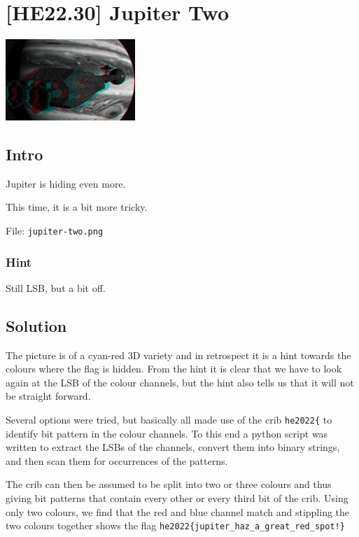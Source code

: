 
\hypertarget{he22.30}{%
\chapter{[HE22.30] Jupiter Two}\label{he22.30}}

\begin{marginfigure}
	\includegraphics[width=49mm]{level7/challenge30.jpg}
\end{marginfigure}
\section{Intro}
Jupiter is hiding even more.

This time, it is a bit more tricky.

File: \verb+jupiter-two.png+
\subsection{Hint}
Still LSB, but a bit off.

\section{Solution}\label{hv22.30solution}

The picture is of a cyan-red 3D variety and in retrospect it is a hint towards the colours where the flag is hidden.  From the hint it is clear that we have to look again at the LSB of the colour channels, but the hint also tells us that it will not be straight forward.

Several options were tried, but basically all made use of the crib \verb+he2022{+ to identify bit pattern in the colour channels.  To this end a python script was written to extract the LSBs of the channels, convert them into binary strings, and then scan them for occurrences of the patterns.

The crib can then be assumed to be split into two or three colours and thus giving bit patterns that contain every other or every third bit of the crib.  Using only two colours, we find that the red and blue channel match and stippling the two colours together shows the flag \verb+he2022{jupiter_haz_a_great_red_spot!}+
